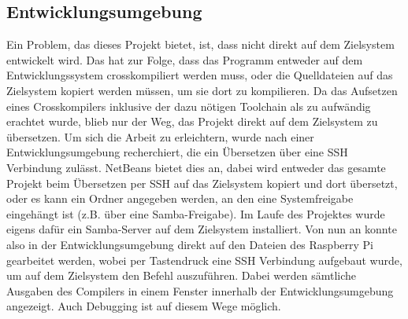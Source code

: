 \subsection{Entwicklungsumgebung}
Ein Problem, das dieses Projekt bietet, ist, dass nicht direkt auf dem Zielsystem entwickelt wird. Das hat zur Folge, dass das Programm entweder auf dem Entwicklungssystem crosskompiliert werden muss, oder die Quelldateien auf das Zielsystem kopiert werden müssen, um sie dort zu kompilieren. Da das Aufsetzen eines Crosskompilers inklusive der dazu nötigen Toolchain als zu aufwändig erachtet wurde, blieb nur der Weg, das Projekt direkt auf dem Zielsystem zu übersetzen. Um sich die Arbeit zu erleichtern, wurde nach einer Entwicklungsumgebung recherchiert, die ein Übersetzen über eine SSH Verbindung zulässt. NetBeans\cite{URL:NetBeans} bietet dies an, dabei wird entweder das gesamte Projekt beim Übersetzen per SSH auf das Zielsystem kopiert und dort übersetzt, oder es kann ein Ordner angegeben werden, an den eine Systemfreigabe eingehängt ist (z.B. über eine Samba-Freigabe). Im Laufe des Projektes wurde eigens dafür ein Samba-Server auf dem Zielsystem installiert. Von nun an konnte also in der Entwicklungsumgebung direkt auf den Dateien des Raspberry Pi gearbeitet werden, wobei per Tastendruck eine SSH Verbindung aufgebaut wurde, um auf dem Zielsystem den Befehl  auszuführen. Dabei werden sämtliche Ausgaben des Compilers in einem Fenster innerhalb der Entwicklungsumgebung angezeigt. Auch Debugging ist auf diesem Wege möglich.

